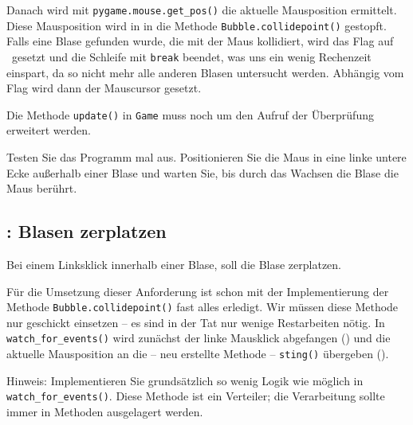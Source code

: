Danach wird mit \texttt{pygame.mouse.\-get\-\_pos()} die aktuelle Mausposition ermittelt. Diese Mausposition wird in  in die Methode \texttt{Bubble.collidepoint()} gestopft. Falls eine Blase gefunden wurde, die mit der Maus kollidiert, wird das Flag auf \true\ gesetzt und die Schleife mit \texttt{break} beendet, was uns ein wenig Rechenzeit einspart, da so nicht mehr alle anderen Blasen untersucht werden. Abhängig vom Flag wird dann der Mauscursor gesetzt.


Die Methode \texttt{update()} in \texttt{Game} muss noch um den Aufruf der Überprüfung erweitert werden.


Testen Sie das Programm mal aus. Positionieren Sie die Maus in eine linke untere Ecke außerhalb einer Blase und warten Sie, bis durch das Wachsen die Blase die Maus berührt.

\subsection{: Blasen zerplatzen}
    Bei einem Linksklick innerhalb einer Blase, soll die Blase zerplatzen.
\er

Für die Umsetzung dieser Anforderung ist schon mit der Implementierung der Methode \texttt{Bubble.collidepoint()} fast alles erledigt. Wir müssen diese Methode nur geschickt einsetzen -- es sind in der Tat nur wenige Restarbeiten nötig. In \texttt{watch\_for\_events()} wird zunächst der linke Mausklick abgefangen () und die aktuelle Mausposition an die -- neu erstellte Methode -- \texttt{sting()} übergeben (). 

Hinweis: Implementieren Sie grundsätzlich so wenig Logik wie möglich in \texttt{watch\_\-for\_\-e\-vents()}. Diese Methode ist ein Verteiler; die Verarbeitung sollte immer in Methoden ausgelagert werden.

